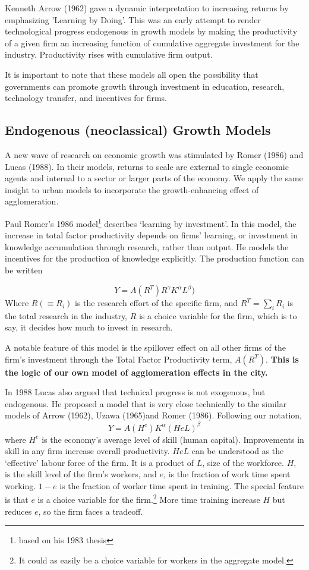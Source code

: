 Kenneth Arrow (1962) gave a dynamic interpretation to increasing returns by emphasizing 'Learning by Doing'. This was an early attempt to render technological progress endogenous in growth models by making the productivity of a given firm an increasing function of cumulative aggregate investment for the industry. Productivity rises with cumulative firm output.


 It is important to note that these models all open the possibility that governments can  promote growth through investment in education, research, technology transfer, and incentives for firms.

\subsection{Endogenous (neoclassical) Growth Models}
A new wave of research on economic growth was stimulated by Romer (1986) and Lucas (1988). In their models, returns to scale are external to single economic agents and internal to a sector or larger parts of the economy. We apply the same insight to urban models to incorporate the growth-enhancing effect of agglomeration. 


Paul Romer's 1986  model\footnote{ based on his 1983 thesis} describes `learning by investment'. In this model, the increase in total factor productivity depends on firms’ learning, or investment in knowledge accumulation through research, rather than output. He models the incentives for the production of knowledge explicitly. The production function  can be written

\[Y = A(R^T)R^\gamma  K^\alpha L^\beta) \]
Where $R(\equiv R_i)$ is the research effort of the specific firm, and $R^T=\sum_iR_i$ is the total research in the industry,  $R$ is a choice variable for the firm, which is to say, it decides how much to invest in research. 

A notable feature of this model is the spillover effect on all other firms of the firm's investment through the Total Factor Productivity term,  $A(R^T)$. \textbf{This is the logic of our own model of agglomeration effects in the city.}



In 1988 Lucas also argued that technical progress is not exogenous, but endogenous. He proposed a model that is very close technically to the similar models of Arrow (1962), Uzawa (1965)and Romer (1986). Following our notation, 
\[ Y = A(H^e) K^\alpha (HeL)^\beta \] 
where $H^e$ is the economy's average level of skill (human capital).  Improvements in skill in any firm  increase overall productivity.  $HeL$  can be understood as the `effective' labour force of the firm. It is a product of $L$, size of the workforce. $H$, is the skill level of the firm's workers, and $e$, is the fraction of work time spent working. $1-e$ is the fraction of worker time  spent in training. The  special feature is that $e$ is a choice variable for the firm.\footnote{It could as easily be a choice variable for workers in the aggregate model.} More time training increase $H$ but reduces $e$, so the firm faces a tradeoff.


